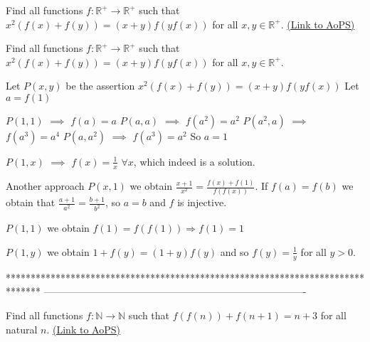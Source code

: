 \begin{problem}
	Find all functions $ f: \mathbb{R}^{+}\to \mathbb{R}^{+}$  such that $x^2(f(x)+f(y))=(x+y)f(yf(x))$ for all $x,y \in \mathbb{R}^{+}$.
	\flushright \href{https://artofproblemsolving.com/community/c6h596685}{(Link to AoPS)}
\end{problem}



\begin{solution}
	\begin{tcolorbox}Find all functions $ f: \mathbb{R}^{+}\to \mathbb{R}^{+}$  such that $x^2(f(x)+f(y))=(x+y)f(yf(x))$ for all $x,y \in \mathbb{R}^{+}$.\end{tcolorbox}
Let $P(x,y)$ be the assertion $x^2(f(x)+f(y))=(x+y)f(yf(x))$
Let $a=f(1)$

$P(1,1)$ $\implies$ $f(a)=a$
$P(a,a)$ $\implies$ $f(a^2)=a^2$
$P(a^2,a)$ $\implies$ $f(a^3)=a^4$
$P(a,a^2)$ $\implies$ $f(a^3)=a^2$
So $a=1$

$P(1,x)$ $\implies$ $\boxed{f(x)=\frac 1x}$ $\forall x$, which indeed is a solution.
\end{solution}



\begin{solution}
	Another approach
$P(x,1)$ we obtain $\displaystyle \frac{x+1}{x^2}=\frac{f(x)+f(1)}{f(f(x))}$.
If $f(a)=f(b)$ we obtain that $\displaystyle \frac{a+1}{a^2}=\frac{b+1}{b^2}$, so $a=b$ and $f$ is injective.

$P(1,1)$ we obtain $f(1)=f(f(1)) \Rightarrow f(1)=1$

$P(1,y)$ we obtain $1+f(y)=(1+y)f(y)$ and so $\displaystyle f(y)=\frac{1}{y}$ for all $y>0$.
\end{solution}
*******************************************************************************
-------------------------------------------------------------------------------

\begin{problem}
	Find all functions $f:\mathbb{N}\to \mathbb{N}$ such that $f(f(n))+f(n+1)=n+3$ for all natural $n$.
	\flushright \href{https://artofproblemsolving.com/community/c6h598760}{(Link to AoPS)}
\end{problem}



